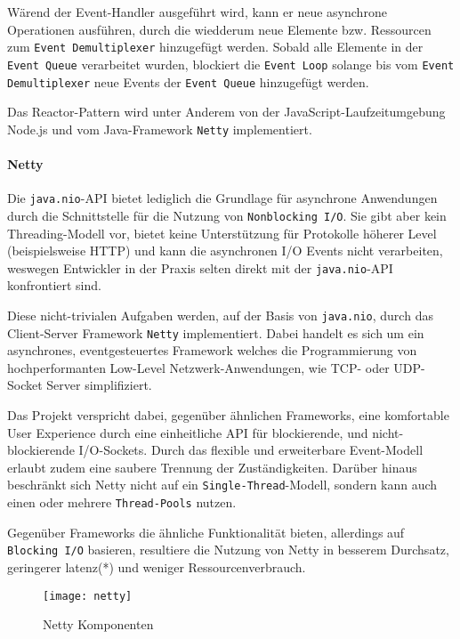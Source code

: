 Wärend der Event-Handler ausgeführt wird, kann er neue asynchrone Operationen ausführen, durch die wiedderum
neue Elemente bzw. Ressourcen zum \verb|Event Demultiplexer| hinzugefügt werden.
Sobald alle Elemente in der \verb|Event Queue| verarbeitet wurden, blockiert die \verb|Event Loop| solange
bis vom \verb|Event Demultiplexer| neue Events der \verb|Event Queue| hinzugefügt werden. \parencite{SchmidtReactorPattern}

Das Reactor-Pattern wird unter Anderem von der JavaScript-Laufzeitumgebung Node.js und vom Java-Framework \verb|Netty| implementiert.

\paragraph{Netty}

Die \verb|java.nio|-API bietet lediglich die Grundlage für asynchrone Anwendungen
durch die Schnittstelle für die Nutzung von \verb|Nonblocking I/O|.
Sie gibt aber kein Threading-Modell vor, bietet keine Unterstützung für Protokolle höherer Level (beispielsweise HTTP) und
kann die asynchronen I/O Events nicht verarbeiten, weswegen Entwickler in der Praxis selten direkt mit der \verb|java.nio|-API
konfrontiert sind.

Diese nicht-trivialen Aufgaben werden, auf der Basis von \verb|java.nio|, durch das Client-Server Framework \verb|Netty| implementiert.
Dabei handelt es sich um ein asynchrones, eventgesteuertes Framework welches
die Programmierung von hochperformanten Low-Level Netzwerk-Anwendungen, wie TCP- oder UDP-Socket Server simplifiziert. \parencite{NettyUserAction}

Das Projekt verspricht dabei, gegenüber ähnlichen Frameworks, eine komfortable User Experience durch eine einheitliche API für
blockierende, und nicht-blockierende I/O-Sockets. Durch das flexible und erweiterbare Event-Modell erlaubt zudem eine saubere Trennung der Zuständigkeiten.
Darüber hinaus beschränkt sich Netty nicht auf ein \verb|Single-Thread|-Modell, sondern kann auch einen oder mehrere \verb|Thread-Pools| nutzen.

Gegenüber Frameworks die ähnliche Funktionalität bieten, allerdings auf \verb|Blocking I/O| basieren, resultiere die Nutzung von Netty
in besserem Durchsatz, geringerer \Gls{latenz}(*) und weniger Ressourcenverbrauch. \parencite{Netty}

\begin{figure}[h!]
  \centering
  \texttt{[image: netty]}
  \caption{Netty Komponenten \parencite{Netty}}
  \label{fig:netty}
\end{figure}